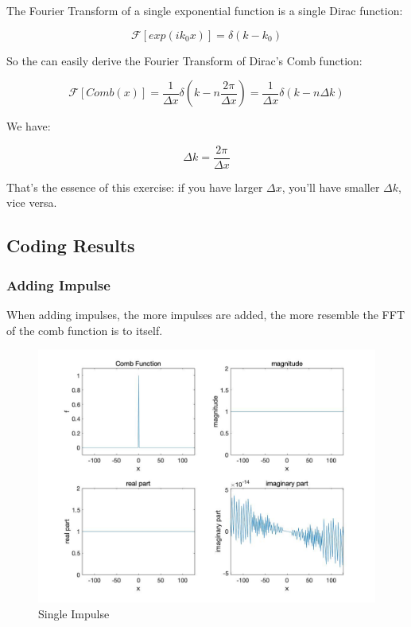 \documentclass[11pt,a4paper,BCOR12mm, headexclude, footexclude, twoside, openright]{scrartcl}
\numberwithin{equation}{section} %
\numberwithin{figure}{section} %
\numberwithin{table}{section} %
\begin{document}
The Fourier Transform of a single exponential function is a single Dirac function:

\begin{equation}
\mathcal{F}[exp(i k_0 x)] = \delta (k - k_0)
\end{equation}

So the can easily derive the Fourier Transform of Dirac's Comb function:

\begin{equation}
    \mathcal{F} [Comb(x)] = \frac{1}{\Delta x} \delta (k - n \frac{2 \pi }{\Delta x}) = \frac{1}{\Delta x} \delta (k - n \Delta k)
\end{equation}

We have:

\begin{equation}
    \Delta k = \frac{2 \pi}{ \Delta x}
\end{equation}

That's the essence of this exercise: if you have larger $\Delta x$, you'll have smaller $\Delta k$, vice versa.

\newpage
\subsection{Coding Results}

\subsubsection{Adding Impulse}

When adding impulses, the more impulses are added, the more resemble the FFT of the comb function is to itself. 

\begin{figure}[h!]
\centering
\includegraphics[scale=0.35]{1.jpg}
\caption{Single Impulse}
\end{figure}
\end{document}
